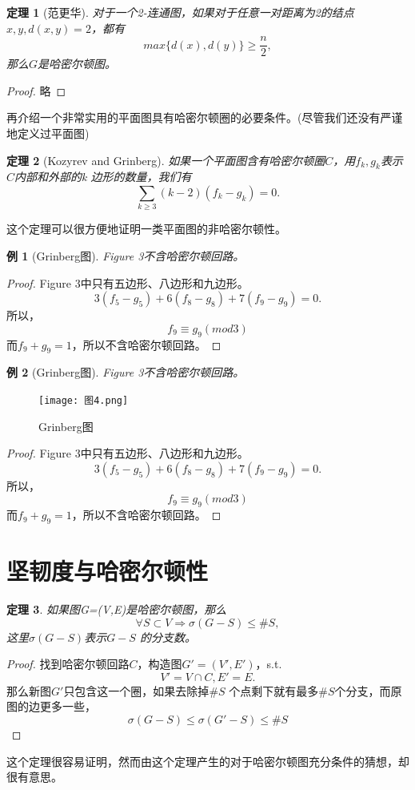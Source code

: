 \documentclass[11pt,a4paper,openany]{book}
\newtheorem{theorem}{\textbf{定理}}[section]
\newtheorem{sample}{\textbf{例}}[section]
\begin{document}
\begin{theorem}[范更华]\K 对于一个2-连通图，如果对于任意一对距离为2的结点$x, y, d(x,y)=2$，都有$$max\{d(x),d(y)\}\geq \frac{n}{2},$$ 那么$G$是哈密尔顿图。\end{theorem}
\begin{proof}略\end{proof}

再介绍一个非常实用的平面图具有哈密尔顿圈的必要条件。(尽管我们还没有严谨地定义过平面图)
\begin{theorem}[Kozyrev and Grinberg] \K 如果一个平面图含有哈密尔顿圈$C$，用$f_k,g_k$表示$C$内部和外部的k 边形的数量，我们有$$\sum_{k\geq3}(k-2)(f_k-g_k)=0.$$\end{theorem}
这个定理可以很方便地证明一类平面图的非哈密尔顿性。

\begin{sample}[Grinberg图] Figure 3不含哈密尔顿回路。\end{sample}
\begin{proof} Figure 3中只有五边形、八边形和九边形。$$3(f_5-g_5)+6(f_8-g_8)+7(f_9-g_9)=0.$$所以，$$f_9\equiv g_9(mod 3)$$ 而$f_9+g_9=1$，所以不含哈密尔顿回路。\end{proof}
\begin{sample}[Grinberg图] Figure 3不含哈密尔顿回路。\end{sample}
\begin{figure}
  \centering
  \texttt{[image: 图4.png]}
  \caption{Grinberg图}
\end{figure}
\begin{proof} Figure 3中只有五边形、八边形和九边形。$$3(f_5-g_5)+6(f_8-g_8)+7(f_9-g_9)=0.$$所以，$$f_9\equiv g_9(mod 3)$$ 而$f_9+g_9=1$，所以不含哈密尔顿回路。\end{proof}

\section{坚韧度与哈密尔顿性}
\begin{theorem} \K 如果图G=(V,E)是哈密尔顿图，那么$$\forall S \subset V \Rightarrow \sigma(G-S)\leq \#S,$$这里$\sigma(G-S)$表示$G-S$ 的分支数。\end{theorem}
\begin{proof} 找到哈密尔顿回路$C$，构造图$G'=(V',E')$，s.t.$$V'=V\cap C, E'= E.$$ 那么新图$G'$只包含这一个圈，如果去除掉$\#S$ 个点剩下就有最多$\#S$个分支，而原图的边更多一些，$$\sigma(G-S)\leq\sigma(G'-S)\leq\#S$$\end{proof}
这个定理很容易证明，然而由这个定理产生的对于哈密尔顿图充分条件的猜想，却很有意思。
\end{document}
